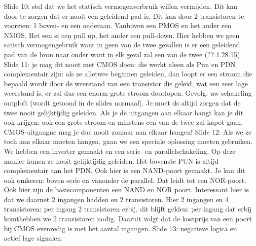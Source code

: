 \documentclass[10pt,a4paper]{book}
\begin{document}
Slide 10: stel dat we het statisch vermogenverbruik willen vermijden. Dit kan door te zorgen dat er nooit een geleidend pad is. Dit kan door 2 transistoren te voorzien: 1 boven- en een onderaan. Vanboven een PMOS en het ander een NMOS. Het een si een pull up, het ander een pull-down. Hier hebben we geen satisch vermogengebruik want in geen van de twee gevallen is er een geleidend pad van de bron naar onder want in elk geval zal een van de twee (?? 1.28.15).
Slide 11: je mag dit nooit met CMOS doen: die werkt aleen als Pun en PDN complementair zijn: als ze alletwee beginnen geleiden, dan loopt er een stroom die bepaald wordt door de weerstand van een transistor die geleid, wat een zeer lage weerstand is, er zal dus een enorm grote stroom doorlopen. Gevolg: uw schakeling ontploft (wordt getoond in de slides normaal). Je moet ds altijd zorgen dat de twee nooit gelijktijdig geleiden.
Als je de uitgangen aan elkaar hangt kan je dit ook krijgen: ook een grote stroom en minstens een van de twee zal kapot gaan. 
CMOS-uitgangne mag je dus nooit zomaar aan elkaar hangen! 
Slide 12: Als we ze toch aan elkaar moeten hangen, gaan we een speciale oplossing moeten gebruiken.  We hebben een inverter gemaakt en een serie- en parallelschakeling. Op deze manier kunen ze nooit gelijktijdig geleiden. Het bovenste PUN is altijd complementair aan het PDN. Ook hier is een NAND-poort gemaakt. Je kan dit ook omkeren: boven serie en vanonder de parallel. Dat leidt tot een NOR-poort. Ook hier zijn de basiscomponenten een NAND en NOR  poort.
Interessant hier is dat we daarnet 2 ingangen hadden en 2 transistoren. Hier 2 ingangen en 4 transistoren: per ingang 2 transistoren erbij, dit blijft gelden: per ingang dat erbij komthebben we 2 transistoren nodig. Daaruit volgt dat de kostprijs van een poort bij CMOS evenredig is met het aantal ingangen.
Slide 13: negatieve logica en actief lage signalen.
\end{document}
